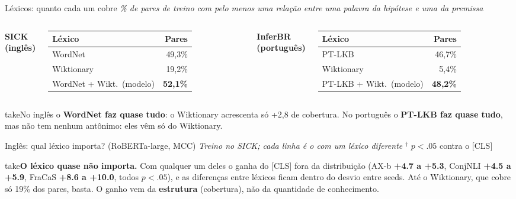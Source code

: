 \documentclass[aspectratio=169,10pt]{beamer}
\newcommand{\up}[1]{\textcolor{logic}{\textbf{#1}}}
\newcommand{\take}[1]{\vspace{4pt}\begin{beamercolorbox}[sep=5pt,rounded=true]{take}\small #1\end{beamercolorbox}}
\newcommand{\tab}[2][1]{\resizebox{#1\linewidth}{!}{}}
\begin{document}
\begin{frame}{Léxicos: quanto cada um cobre}
\textit{\small \% de pares de treino com pelo menos uma relação entre uma palavra da hipótese e uma da premissa}\\[6pt]
\begin{columns}[T]
\centering\small
\textbf{SICK (inglês)}\\[3pt]
\begin{tabular}{@{}lr@{}}
\toprule
Léxico & Pares \\
\midrule
WordNet & 49,3\% \\
Wiktionary & 19,2\% \\
\midrule
WordNet + Wikt.\ (modelo) & \textbf{52,1\%} \\
\bottomrule
\end{tabular}
\centering\small
\textbf{InferBR (português)}\\[3pt]
\begin{tabular}{@{}lr@{}}
\toprule
Léxico & Pares \\
\midrule
PT-LKB & 46,7\% \\
Wiktionary & 5,4\% \\
\midrule
PT-LKB + Wikt.\ (modelo) & \textbf{48,2\%} \\
\bottomrule
\end{tabular}
\end{columns}
\take{No inglês o \textbf{WordNet faz quase tudo}: o Wiktionary acrescenta só +2,8 de cobertura. No português o \textbf{PT-LKB faz quase tudo}, mas não tem nenhum antônimo: eles vêm só do Wiktionary.}
\end{frame}

\begin{frame}{Inglês: qual léxico importa? (RoBERTa-large, MCC)}
\textit{\small Treino no SICK; cada linha é o \model{} com um léxico diferente} \hfill {\scriptsize $^\dagger$ $p<.05$ contra o [CLS]}\\[3pt]
\centering\tab[0.92]{lex_en}
\take{\textbf{O léxico quase não importa.} Com qualquer um deles o \model{} ganha do [CLS] fora da distribuição (AX-b \up{+4.7 a +5.3}, ConjNLI \up{+4.5 a +5.9}, FraCaS \up{+8.6 a +10.0}, todos $p<.05$), e as diferenças entre léxicos ficam dentro do desvio entre seeds. Até o Wiktionary, que cobre só 19\% dos pares, basta. O ganho vem da \textbf{estrutura} (cobertura), não da quantidade de conhecimento.}
\end{frame}
\end{document}
